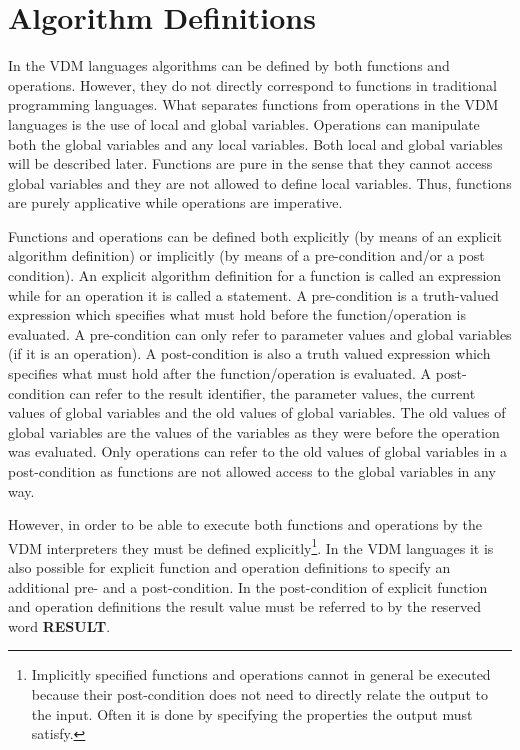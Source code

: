 \documentclass{overturerepchap}
\newcommand{\keyw}[1]{{\bf\ttfamily #1}}
\begin{document}
\chapter{Algorithm Definitions}
\label{algorithm}


In the VDM languages algorithms can be defined by both
functions and operations.  However, they do not directly correspond to
functions in traditional programming languages. What separates
functions from operations in the VDM languages is the use of
local and global variables. Operations can manipulate both the global
variables and any local variables.  Both
local and global variables will be described later. Functions are pure in
the sense that they cannot access global variables and they are not
allowed to define local variables. Thus, functions are purely
applicative while operations are imperative.

Functions and operations can be defined both explicitly (by means of
an explicit algorithm definition) or implicitly (by means of a
pre-condition and/or a post condition).  An explicit algorithm
definition for a function is called an expression while for an
operation it is called a statement.  A pre-condition is a truth-valued
expression which specifies what must hold before the
function/operation is evaluated. A pre-condition can only refer to
parameter values and global variables (if it is an operation).  A
post-condition is also a truth valued expression which specifies what
must hold after the function/operation is evaluated. A post-condition
can refer to the result identifier, the parameter values, the current
values of global variables and the old values of global variables. The
old values of global variables are the values of the variables as they
were before the operation was evaluated.  Only operations can refer to
the old values of global variables in a post-condition as functions
are not allowed access to the global variables in any way.

However, in order to be able to execute both functions and operations
by the VDM interpreters they must be defined explicitly\footnote{Implicitly
specified functions and operations cannot in general be executed
because their post-condition does not need to directly relate the
output to the input. Often it is done by specifying the properties the
output must satisfy.}. In the VDM languages it is also
possible for explicit function and operation definitions to specify an
additional pre- and a post-condition.  In the post-condition of
explicit function and operation definitions the result value must be
referred to by the reserved word \keyw{RESULT}.
\end{document}
